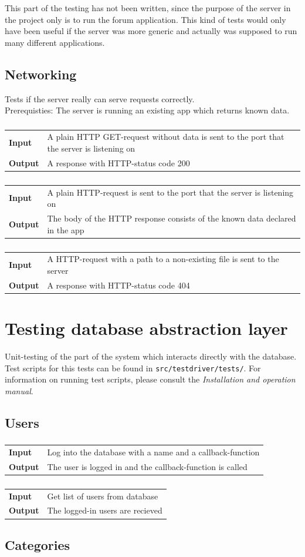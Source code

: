 \documentclass[a4paper, 12pt, titlepage]{article}
\newcommand{\testcase}[2]{
	\subsubsection{}
	\begin{tabular}{l p{11cm}}
	\bf{Input} & 
		#1\\
	\bf{Output} & 
		#2\\
	\end{tabular}
}
\begin{document}
	This part of the testing has not been written, since the purpose of the server in the project only is to run the forum application. This kind of tests would only have been useful if the server was more generic and actually was supposed to run many different applications.


	\subsection{Networking}
	Tests if the server really can serve requests correctly.\\
	Prerequisties: The server is running an existing app which returns known data.

		\testcase
		{
			A plain HTTP GET-request without data is sent to the port that the server is listening on
		}{
			A response with HTTP-status code 200
		}

		\testcase
		{
			A plain HTTP-request is sent to the port that the server is listening on
		}{
			The body of the HTTP response consists of the known data declared in the app
		}

		\testcase
		{
			A HTTP-request with a path to a non-existing file is sent to the server
		}{
			 A response with HTTP-status code 404
		}

	\section{Testing database abstraction layer}
	Unit-testing of the part of the system which interacts directly with the database.\\

	Test scripts for this tests can be found in \lstinline{src/testdriver/tests/}. For information on running test scripts, please consult the \emph{Installation and operation manual}. 

	\subsection{Users}

		\testcase
		{
			Log into the database with a name and a callback-function
		}{
			The user is logged in and the callback-function is called
		}

		\testcase
		{
			Get list of users from database
		}{
			The logged-in users are recieved
		}

	\subsection{Categories}
\end{document}
